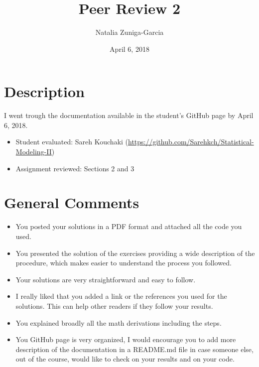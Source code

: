 \documentclass[11 pt]{article}
\author{Natalia Zuniga-Garcia}
\title{Peer Review 2}
\date{April 6, 2018}
\begin{document}
\maketitle

\section{Description}

I went trough the documentation available in the student's GitHub page by April 6, 2018.

\begin{itemize}
	\item Student evaluated:  Sareh Kouchaki (\url{https://github.com/Sarehkch/Statistical-Modeling-II})
	\item Assignment reviewed: Sections 2 and 3

\end{itemize}
	


\section{General Comments}
\begin{itemize}
	\item You posted your solutions in a PDF format and attached all the code you used.
	\item You presented the solution of the exercises providing a wide description of the procedure, which makes easier to understand the process you followed.
	\item Your solutions are very straightforward and easy to follow.
	\item I really liked that you added a link or the references you used for the solutions. This can help other readers if they follow your results.
	\item You explained broadly all the math derivations including the steps.
	\item You GitHub page is very organized, I would encourage you to add more description of the documentation in a README.md file in case someone else, out of the course, would like to check on your results and on your code. 

	
\end{itemize}
\end{document}
